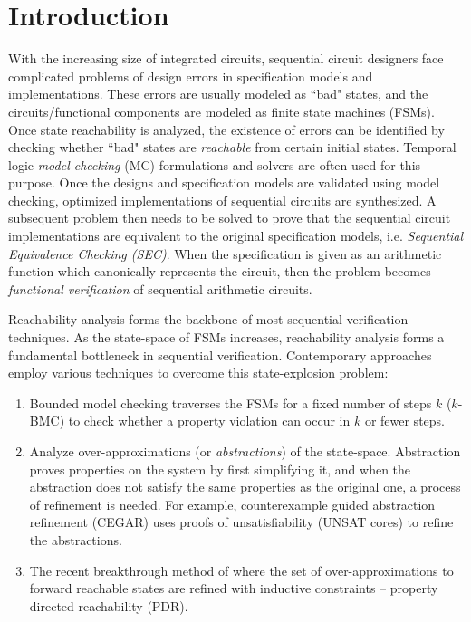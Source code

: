 \chapter{Introduction}
\label{ch:intro}
With the increasing size of integrated
circuits, sequential circuit designers face complicated problems of
design errors in specification models and implementations. These
errors are usually modeled as ``bad" states, and the
circuits/functional components are modeled as finite state machines
(FSMs). Once state reachability is analyzed, the existence of errors
can be identified by checking whether ``bad" states are {\it
  reachable} from certain initial states. Temporal logic {\it model
  checking} (MC) formulations and solvers are often used for this
purpose. Once the designs and specification models are validated using
model checking, optimized implementations of sequential circuits are
synthesized. A subsequent problem then needs to be solved to prove
that the sequential circuit implementations are equivalent to the
original specification models, i.e. {\it Sequential Equivalence
  Checking   (SEC)}. When the specification is given as an arithmetic function
which canonically represents the circuit, then the problem 
becomes {\it functional verification} of sequential arithmetic circuits.

Reachability analysis forms the backbone of most sequential
verification techniques. As the state-space of FSMs increases,
reachability analysis forms a fundamental bottleneck in sequential
verification. Contemporary approaches employ various techniques to
overcome this state-explosion problem: 

\begin{enumerate}[{1)}]
\item Bounded model checking
\cite{bitlevel1} traverses the FSMs for a fixed number of steps $k$
($k$-BMC) to check whether a property violation can occur in $k$ or
fewer steps.  
\item Analyze over-approximations (or {\it abstractions})
of the state-space. Abstraction proves properties on the system by
first simplifying it, and when the abstraction does not satisfy the
same properties as the original one, a process of refinement is
needed. For example, counterexample guided
abstraction refinement (CEGAR) \cite{cegar-journal} uses proofs of
unsatisfiability (UNSAT cores) to refine the abstractions.
\item The recent breakthrough method of \cite{bradley:pdr} where the set of
over-approximations to forward reachable states are refined with
inductive constraints -- property directed reachability (PDR). 
\end{enumerate}

